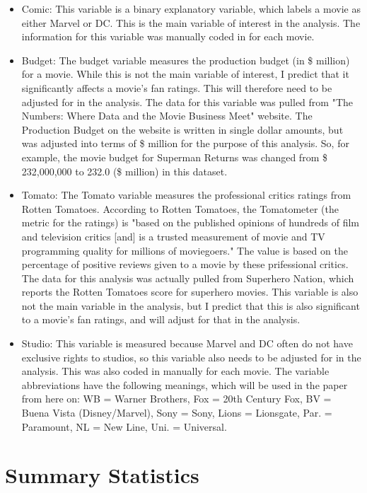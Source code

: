 \documentclass{svproc}
\begin{document}
\begin{itemize}
\item Comic: This variable is a binary explanatory variable, which labels a movie as either Marvel or DC. This is the main variable of interest in the analysis. The information for this variable was manually coded in for each movie. 

\smallskip
\item Budget: The budget variable measures the production budget (in \$ million) for a movie. While this is not the main variable of interest, I predict that it significantly affects a movie's fan ratings. This will therefore need to be adjusted for in the analysis. The data for this variable was pulled from "The Numbers: Where Data and the Movie Business Meet" website. The Production Budget on the website is written in single dollar amounts, but was adjusted into terms of \$ million for the purpose of this analysis. So, for example, the movie budget for Superman Returns was changed from \$ 232,000,000 to 232.0 (\$ million) in this dataset.
\smallskip
\item Tomato: The Tomato variable measures the professional critics ratings from Rotten Tomatoes. According to Rotten Tomatoes, the Tomatometer (the metric for the ratings) is "based on the published opinions of hundreds of film and television critics [and] is a trusted measurement of movie and TV programming quality for millions of moviegoers." The value is based on the percentage of positive reviews given to a movie by these prifessional critics. The data for this analysis was actually pulled from Superhero Nation, which reports the Rotten Tomatoes score for superhero movies. This variable is also not the main variable in the analysis, but I predict that this is also significant to a movie's fan ratings, and will adjust for that in the analysis. 
\smallskip
\item Studio: This variable is measured because Marvel and DC often do not have exclusive rights to studios, so this variable also needs to be adjusted for in the analysis. This was also coded in manually for each movie. The variable abbreviations have the following meanings, which will be used in the paper from here on: WB = Warner Brothers, Fox = 20th Century Fox, BV = Buena Vista (Disney/Marvel), Sony = Sony, Lions = Lionsgate, Par. = Paramount, NL = New Line, Uni. = Universal.

\end{itemize}

\section{Summary Statistics}
\end{document}
